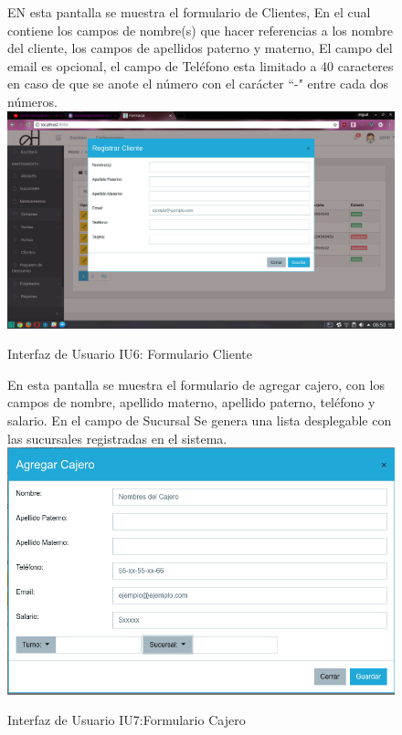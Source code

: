 \begin{figure}[htbp!]
	\begin{center}
	EN esta pantalla se muestra el formulario de Clientes, En el cual contiene los campos de nombre(s) que hacer referencias a los nombre del cliente, los campos de apellidos paterno y materno, El campo del email es opcional, el campo de Teléfono esta limitado a 40 caracteres en caso de que se anote el número con el carácter ``-" entre cada dos números.
\includegraphics[width=\textwidth]{Pantallas/FormularioClientes}
		\caption{Interfaz de Usuario IU6: Formulario Cliente}
	\end{center}
\end{figure}


\begin{figure}[htbp!]
	\begin{center}
	En esta pantalla se muestra el formulario de agregar cajero, con los campos de nombre, apellido materno, apellido paterno, teléfono y salario. En el campo de Sucursal Se genera una lista desplegable con las sucursales registradas en el sistema.
\includegraphics[width=\textwidth]{Pantallas/FormulariCajero}
		\caption{Interfaz de Usuario IU7:Formulario Cajero}
	\end{center}
\end{figure}




